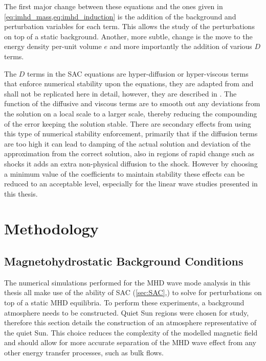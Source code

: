 \documentclass[a4paper,12pt,fourier,authoryear,custommargin]{Classes/PhDThesisPSnPDF}
\providecommand{\DIFaddtex}[1]{{\protect\color{blue}\uwave{#1}}} %
\providecommand{\DIFaddbegin}{} %
\providecommand{\DIFaddend}{} %
\providecommand{\DIFadd}[1]{\texorpdfstring{\DIFaddtex{#1}}{#1}} %
\begin{document}
The first major change between these equations and the ones given in \cref{eq:imhd_mass,eq:imhd_induction} is the addition of the background and perturbation variables for each term.
This allows the study of the perturbations on top of a static background.
Another, more subtle, change is the move to the energy density per-unit volume $e$ and more importantly the addition of various $D$ terms.

The $D$ terms in the SAC equations are hyper-diffusion or hyper-viscous terms that enforce numerical stability upon the equations, they are adapted from\DIFaddbegin \DIFadd{~}\DIFaddend \cite{nordlund1995} and shall not be replicated here in detail, however, they are described in \citet{shelyag2008}.
The function of the diffusive and viscous terms are to smooth out any deviations from the solution on a local scale to a larger scale, thereby reducing the compounding of the error keeping the solution stable.
There are secondary effects from using this type of numerical stability enforcement, primarily that if the diffusion terms are too high it can lead to damping of the actual solution and deviation of the approximation from the correct solution, also in regions of rapid change such as shocks it adds an extra non-physical diffusion to the shock.
However by choosing a minimum value of the coefficients to maintain stability these effects can be reduced to an acceptable level, especially for the linear wave studies presented in this thesis.

\clearpage{}%
%

%
\clearpage{}%
\chapter{Methodology}\label{ch:methodology}  %


\section{Magnetohydrostatic Background Conditions}\label{sec:mhsbackground}

The numerical simulations performed for the MHD wave mode analysis in this thesis all make use of the ability of SAC (\cref{sec:SAC},\DIFaddbegin \DIFadd{~}\DIFaddend \citealt{shelyag2008}) to solve for perturbations on top of a static MHD equilibria.
To perform these experiments, a background atmosphere needs to be constructed.
Quiet Sun regions were chosen for study, therefore this section details the construction of an atmosphere representative of the quiet Sun.
This choice reduces the complexity of the modelled magnetic field and should allow for more accurate separation of the MHD wave effect from any other energy transfer processes, such as bulk flows.
\end{document}
